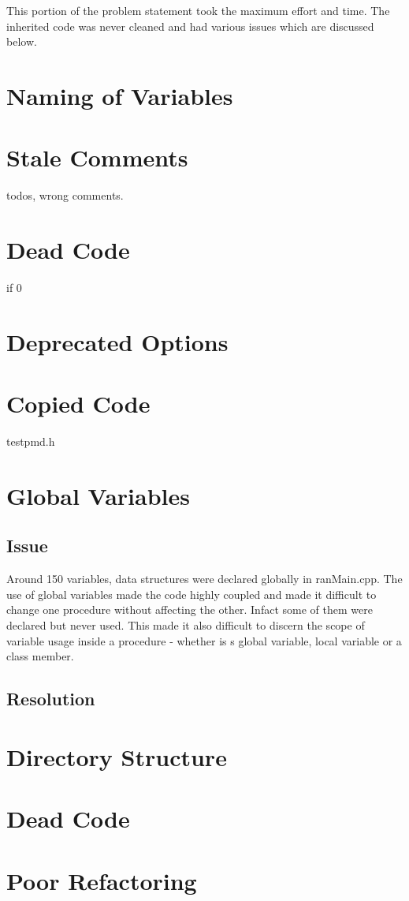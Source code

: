 This portion of the problem statement took the maximum effort and time.
The inherited code was never cleaned and had various issues which are discussed below.
\section{Naming of Variables}
\section{Stale Comments}
todos, wrong comments.
\section{Dead Code}
if 0
\section{Deprecated Options}
\section{Copied Code}
testpmd.h
\section{Global Variables}
\subsection{Issue}
Around 150 variables, data structures were declared globally in ranMain.cpp. The use of 
global variables made the code highly coupled and made it difficult to change one procedure 
without affecting the other. Infact some of them were declared but never used. 
This made it also difficult to discern the scope of variable usage inside a procedure - whether is s global variable, 
local variable or a class member.
\subsection{Resolution}

\section{Directory Structure}
\section{Dead Code}
\section{Poor Refactoring}
